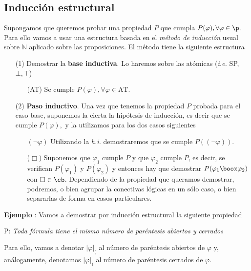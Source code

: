 \subsection{Inducción estructural}
Supongamos que queremos probar una propiedad $P$ que cumpla $P(\varphi), \forall \varphi \in \p$. Para ello vamos a usar una estructura basada en el \textit{método de inducción} usual sobre $\mathbb{N}$ aplicado sobre las proposiciones. El método tiene la siguiente estructura 
\begin{itemize}
	\item[(1)] Demostrar la \textbf{base inductiva}. Lo haremos sobre las atómicas (\textit{i.e.} SP, $\bot, \top$)
	\begin{itemize}
		\item[(AT)] Se cumple $P(\varphi), \forall \varphi \in \mbox{AT}$.
	\end{itemize}
	\item[(2)] \textbf{Paso inductivo}. Una vez que tenemos la propiedad $P$ probada para el caso base, suponemos la cierta la hipótesis de inducción, es decir que se cumple $P(\varphi),$ y la utilizamos para los dos casos siguientes
	\begin{itemize}
		\item[$(\lnot \varphi)$] Utilizando la \textit{h.i.} demostraremos que se cumple $P((\lnot \varphi))$.
		\item[($\Box$)] Suponemos que $\varphi_1$ cumple $P$ y que $\varphi_2$ cumple $P$, es decir, se verifican $P(\varphi_1)$ y $P(\varphi_2)$ y entonces hay que demostrar $P(\varphi_1 \boox \varphi_2)$ con $\Box \in \cb$. Dependiendo de la propiedad que queramos demostrar, podremos, o bien agrupar la conectivas lógicas en un sólo caso, o bien separarlas de forma en casos particulares. 
	\end{itemize}
\end{itemize} 
\addtocounter{ej}{1} %
\textbf{Ejemplo }: Vamos a demostrar por inducción estructural la siguiente propiedad
\begin{center}
P: \textit{Toda fórmula tiene el mismo número de paréntesis abiertos y cerrados}
\end{center}
Para ello, vamos a denotar $\vert \varphi \vert_{(}$ al número de paréntesis abiertos de $\varphi$ y, análogamente, denotamos $\vert \varphi \vert_{)}$ al número de paréntesis cerrados de $\varphi$.
